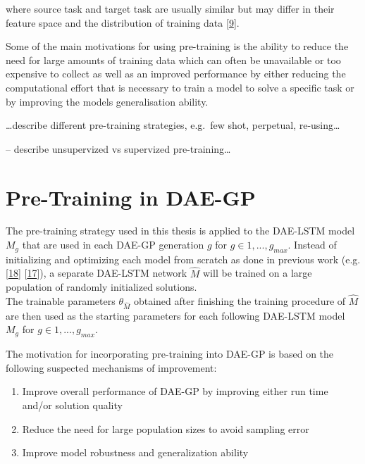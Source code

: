 \documentclass[
  11pt,
]{article}
\providecommand{\tightlist}{%
  \setlength{\itemsep}{0pt}\setlength{\parskip}{0pt}}
\begin{document}
where source task and target task are usually similar but may differ in
their feature space and the distribution of training data
{[}\protect\hyperlink{ref-survey_transfer_learning}{9}{]}.

Some of the main motivations for using pre-training is the ability to
reduce the need for large amounts of training data which can often be
unavailable or too expensive to collect as well as an improved
performance by either reducing the computational effort that is
necessary to train a model to solve a specific task or by improving the
models generalisation ability.

\ldots describe different pre-training strategies, e.g.~few shot,
perpetual, re-using\ldots{}

-- describe unsupervized vs supervized pre-training\ldots{}

\hypertarget{pre-training-in-dae-gp}{%
\section{Pre-Training in DAE-GP}\label{pre-training-in-dae-gp}}

The pre-training strategy used in this thesis is applied to the DAE-LSTM
model \(M_g\) that are used in each DAE-GP generation \(g\) for
\(g\in{1,...,g_{max}}\). Instead of initializing and optimizing each
model from scratch as done in previous work (e.g.
{[}\protect\hyperlink{ref-dae-gp_2020_rtree}{18}{]}
{[}\protect\hyperlink{ref-dae-gp_2022_symreg}{17}{]}), a separate
DAE-LSTM network \(\hat{M}\) will be trained on a large population of
randomly initialized solutions.\\
The trainable parameters \(\theta_{\hat{M}}\) obtained after finishing
the training procedure of \(\hat{M}\) are then used as the starting
parameters for each following DAE-LSTM model \(M_g\) for
\(g\in{1,...,g_{max}}\).

The motivation for incorporating pre-training into DAE-GP is based on
the following suspected mechanisms of improvement:

\begin{enumerate}
\def\labelenumi{\arabic{enumi}.}
\tightlist
\item
  Improve overall performance of DAE-GP by improving either run time
  and/or solution quality
\item
  Reduce the need for large population sizes to avoid sampling error
\item
  Improve model robustness and generalization ability
\end{enumerate}
\end{document}
